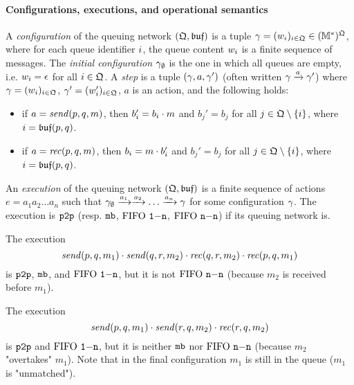 \paragraph{\bf Configurations, executions, and operational semantics}
A \emph{configuration} of the queuing network $(\mathfrak{Q},\mathfrak{buf})$ is
a tuple $\gamma=(w_{i})_{i\in\mathfrak{Q}}\in (\mathbb{M}^*)^{\mathfrak{Q}}$,
where for each queue identifier $i$, the queue content $w_{i}$ is a finite sequence of messages.
The \emph{initial configuration} $\gamma_{\emptyset}$ is the one in which all queues are empty, i.e.
$w_{i}=\epsilon$ for all $i\in\mathfrak{Q}$.
A \emph{step} is a tuple $(\gamma,a,\gamma')$ (often written $\gamma\xrightarrow{a}\gamma'$)
where $\gamma=(w_{i})_{i\in\mathfrak{Q}}$,
$\gamma'=(w_{i}')_{i\in\mathfrak{Q}}$,
$a$ is an action, and the following holds:
\begin{itemize}
  \item if $a=\mathit{send}(p, q, m)$, then $b'_{i}=b_{i}\cdot m$
  and $b_j'=b_j$ for all $j\in \mathfrak{Q}\setminus\{i\}$,
  where $i=\mathfrak{buf}(p,q)$.
  \item if $a=\mathit{rec}(p, q, m)$, then $b_{i}=m\cdot b'_{i}$
  and $b_j'=b_j$ for all $j\in \mathfrak{Q}\setminus\{i\}$,
  where $i=\mathfrak{buf}(p,q)$.
\end{itemize}
An \emph{execution} of the queuing network $(\mathfrak{Q},\mathfrak{buf})$
is a finite sequence of actions $e=a_1a_2\ldots a_n$ such that
$\gamma_{\emptyset}\xrightarrow{a_1}\xrightarrow{a_2}\ldots\xrightarrow{a_n}\gamma$ for some configuration $\gamma$.
The execution is $\mathtt{p2p}$ (resp. $\mathtt{mb}$, $\text{FIFO } \mathtt{1\mathsf{-}n}$, $\text{FIFO } \mathtt{n\mathsf{-}n}$) if its queuing network is.

\begin{example}
The execution
$$
\mathit{send}(p, q, m_1)\cdot\mathit{send}(q, r, m_2)\cdot\mathit{rec}(q, r, m_2)\cdot\mathit{rec}(p, q, m_1)
$$
is $\mathtt{p2p}$, $\mathtt{mb}$, and $\text{FIFO } \mathtt{1\mathsf{-}n}$, but it is not $\text{FIFO } \mathtt{n\mathsf{-}n}$ (because $m_2$ is received before $m_1$).
\end{example}

\begin{example}
    The execution
    $$
    \mathit{send}(p, q, m_1)\cdot\mathit{send}(r, q, m_2)\cdot\mathit{rec}(r, q, m_2)
    $$
    is $\mathtt{p2p}$ and $\text{FIFO } \mathtt{1\mathsf{-}n}$, but it is neither $\mathtt{mb}$ nor $\text{FIFO } \mathtt{n\mathsf{-}n}$ (because $m_2$ "overtakes" $m_1$). Note that in the
    final configuration $m_1$ is still in the queue ($m_1$ is "unmatched").
\end{example}


